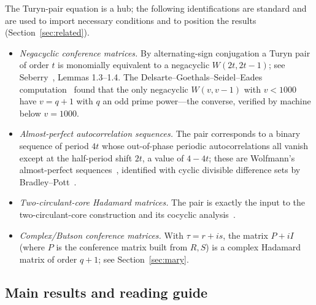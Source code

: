 \documentclass[11pt]{article}
\theoremstyle{plain}
\theoremstyle{definition}
\theoremstyle{remark}
\begin{document}
The Turyn-pair equation is a hub; the following identifications are standard and
are used to import necessary conditions and to position the results
(Section~\ref{sec:related}).
\begin{itemize}
\item \emph{Negacyclic conference matrices.} By alternating-sign conjugation a
  Turyn pair of order $t$ is monomially equivalent to a negacyclic $W(2t,2t-1)$;
  see Seberry~\cite{Seberry16}, Lemmas 1.3--1.4. The
  Delsarte--Goethals--Seidel--Eades computation~\cite{DGS71,Seberry16} found
  that the only negacyclic $W(v,v-1)$ with $v<1000$ have $v=q+1$ with $q$ an
  odd prime power---the converse, verified by machine below $v=1000$.
\item \emph{Almost-perfect autocorrelation sequences.} The pair corresponds to
  a binary sequence of period $4t$ whose out-of-phase periodic autocorrelations
  all vanish except at the half-period shift $2t$, a value of $4-4t$; these are
  Wolfmann's almost-perfect sequences~\cite{Wolfmann92}, identified with cyclic
  divisible difference sets by Bradley--Pott~\cite{PB95}.
\item \emph{Two-circulant-core Hadamard matrices.} The pair is exactly the input
  to the two-circulant-core construction and its cocyclic analysis~\cite{BAOD22}.
\item \emph{Complex/Butson conference matrices.} With $\tau=r+is$, the matrix
  $P+iI$ (where $P$ is the conference matrix built from $R,S$) is a complex
  Hadamard matrix of order $q+1$; see Section~\ref{sec:mary}.
\end{itemize}


\subsection{Main results and reading guide}
\end{document}
